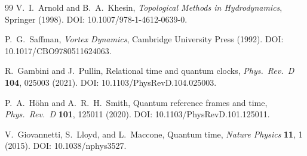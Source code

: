\documentclass[pdflatex,sn-mathphys-num]{sn-jnl}
\theoremstyle{thmstylethree}
\theoremstyle{thmstyleone}
\theoremstyle{thmstyletwo}
\numberwithin{equation}{section}
\begin{document}
\begin{thebibliography}{99}
            V.~I.~Arnold and B.~A.~Khesin,
            \textit{Topological Methods in Hydrodynamics},
            Springer (1998).
            DOI: 10.1007/978-1-4612-0639-0.
            
            P.~G.~Saffman,
            \textit{Vortex Dynamics},
            Cambridge University Press (1992).
            DOI: 10.1017/CBO9780511624063.
            
            R.~Gambini and J.~Pullin,
            Relational time and quantum clocks,
            \textit{Phys.\ Rev.\ D} \textbf{104}, 025003 (2021).
            DOI: 10.1103/PhysRevD.104.025003.
            
            P.~A.~H{\"o}hn and A.~R.~H.~Smith,
            Quantum reference frames and time,
            \textit{Phys.\ Rev.\ D} \textbf{101}, 125011 (2020).
            DOI: 10.1103/PhysRevD.101.125011.
            
            V.~Giovannetti, S.~Lloyd, and L.~Maccone,
            Quantum time,
            \textit{Nature Physics} \textbf{11}, 1 (2015).
            DOI: 10.1038/nphys3527.
        
        \end{thebibliography}
\end{document}
